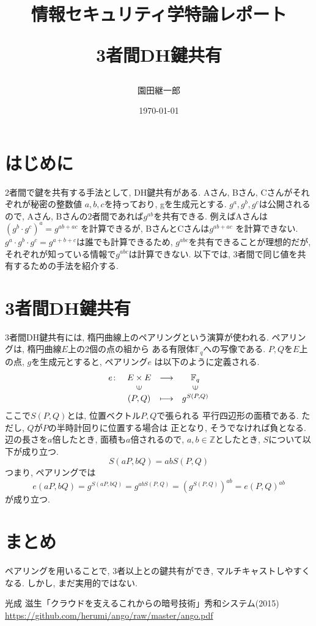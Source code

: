 \documentclass[a4paper,11pt]{jsarticle}
\begin{document}
\title{情報セキュリティ学特論レポート

3者間DH鍵共有}
\author{園田継一郎}
\date{\today}
\maketitle

\section{はじめに}
2者間で鍵を共有する手法として, DH鍵共有がある.
Aさん, Bさん, Cさんがそれぞれが秘密の整数値
$a, b, c$を持っており, gを生成元とする.
$g^a, g^b, g^c$は公開されるので, 
Aさん, Bさんの2者間であれば$g^{ab}$を共有できる.
例えばAさんは$(g^b \cdot g^c)^a = g^{ab + ac}$
を計算できるが, BさんとCさんは$g^{ab + ac}$
を計算できない.
$g^a \cdot g^b \cdot g^c = g^{a + b + c}$は誰でも計算できるため, 
$g^{abc}$を共有できることが理想的だが, 
それぞれが知っている情報で$g^{abc}$は計算できない.
以下では, 3者間で同じ値を共有するための手法を紹介する.

\section{3者間DH鍵共有}
3者間DH鍵共有には, 楕円曲線上のペアリングという演算が使われる.
ペアリングは, 楕円曲線$E$上の2個の点の組から
ある有限体$\mathbb{F}_q$への写像である\cite{bib1}.
$P, Q$を$E$上の点, $g$を生成元とすると, ペアリング$e$
は以下のように定義される.
\[
  \begin{array}{rccc}
    e \colon & E \times E & \longrightarrow & \mathbb{F}_q \\
            & \rotatebox{90}{$\in$} & & \rotatebox{90}{$\in$} \\
            & (P, Q) & \longmapsto & g^{S(P, Q)}
  \end{array}
\]
ここで$S(P, Q)$とは, 位置ベクトル$P, Q$で張られる
平行四辺形の面積である. ただし, $Q$が$P$の半時計回りに位置する場合は
正となり, そうでなければ負となる. 辺の長さを$a$倍したとき, 
面積も$a$倍されるので, $a, b \in \mathbb{Z}$としたとき, 
$S$について以下が成り立つ. 
\[
  S(aP, bQ) = abS(P, Q)
\]
つまり, ペアリングでは
\[
  e(aP, bQ) = g^{S(aP, bQ)} = g^{abS(P, Q)} =
  \left(g^{S(P, Q)}\right)^{ab} = e(P, Q)^{ab}
\]
が成り立つ.

\section{まとめ}
ペアリングを用いることで, 3者以上との鍵共有ができ,
マルチキャストしやすくなる.
しかし, まだ実用的ではない.

\begin{thebibliography}{99}
  光成 滋生「クラウドを支えるこれからの暗号技術」秀和システム(2015) \url{https://github.com/herumi/ango/raw/master/ango.pdf}
\end{thebibliography}
\end{document}

